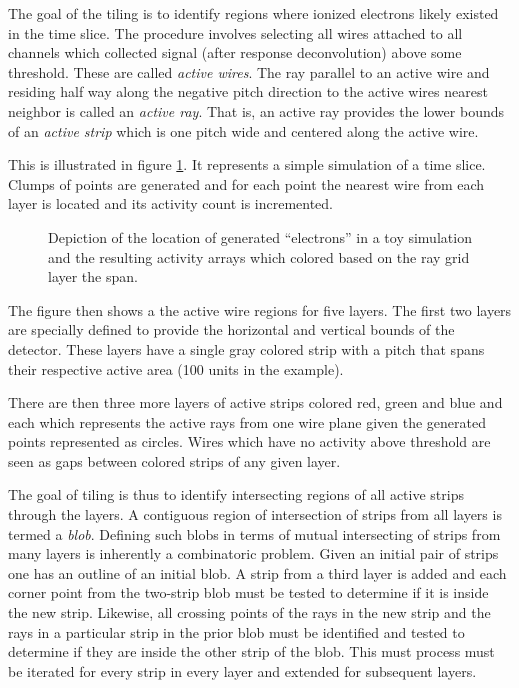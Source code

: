 \documentclass[11pt]{article}
\begin{document}
The goal of the tiling is to identify regions where ionized electrons likely existed in the time slice.  The procedure involves selecting all wires attached to all channels which collected signal (after response deconvolution) above some threshold.  These are called \emph{active wires}.  The ray parallel to an active wire and residing half way along the negative pitch direction to the active wires nearest neighbor is called an \emph{active ray}.  That is, an active ray provides the lower bounds of an  \emph{active strip} which is one pitch wide and centered along the active wire.

This is illustrated in figure \ref{fig:activity}.  It represents a simple simulation of a time slice.   Clumps of points are generated and for each point the nearest wire from each layer is located and its activity count is incremented.  


\begin{figure}[htbp]
\centering

\caption{\label{fig:activity}
Depiction of the location of generated ``electrons'' in a toy simulation and the resulting activity arrays which colored based on the ray grid layer the span.}
\end{figure}


The figure then shows a the active wire regions for five layers.  The first two layers are specially defined to provide the horizontal and vertical bounds of the detector.  These layers have a single gray colored strip with a pitch that spans their respective active area (100 units in the example).  

There are then three more layers of active strips colored red, green and blue and each which represents the active rays from one wire plane given the generated points represented as circles.  Wires which have no activity above threshold are seen as gaps between colored strips of any given layer.

The goal of tiling is thus to identify intersecting regions of all active strips through the layers. A contiguous region of intersection of strips from all layers is termed a \emph{blob}.  Defining such blobs in terms of mutual intersecting of strips from many layers is inherently a combinatoric problem.  Given an initial pair of strips one has an outline of an initial blob.  A strip from a third layer is added and each corner point from the two-strip blob must be tested to determine if it is inside the new strip.  Likewise, all crossing points of the rays in the new strip and the rays in a particular strip in the prior blob must be identified and tested to determine if they are inside the other strip of the blob.  This must process must be iterated for every strip in every layer and extended for subsequent layers.
\end{document}
